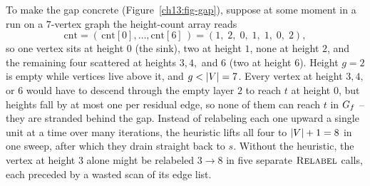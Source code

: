 To make the gap concrete (Figure~\ref{ch13:fig-gap}), suppose at some moment in a run on a $7$-vertex graph the height-count array reads
\[
  \mathrm{cnt} = (\,\mathrm{cnt}[0],\dots,\mathrm{cnt}[6]\,) = (1,\;2,\;0,\;1,\;1,\;0,\;2),
\]
so one vertex sits at height $0$ (the sink), two at height $1$, none at height $2$, and the remaining four scattered at heights $3,4,$ and $6$ (two at height $6$). Height $g=2$ is empty while vertices live above it, and $g<\lvert V\rvert=7$. Every vertex at height $3,4,$ or $6$ would have to descend through the empty layer $2$ to reach $t$ at height $0$, but heights fall by at most one per residual edge, so none of them can reach $t$ in $G_f$ -- they are stranded behind the gap. Instead of relabeling each one upward a single unit at a time over many iterations, the heuristic lifts all four to $\lvert V\rvert+1=8$ in one sweep, after which they drain straight back to $s$. Without the heuristic, the vertex at height $3$ alone might be relabeled $3\to8$ in five separate $\textsc{Relabel}$ calls, each preceded by a wasted scan of its edge list.

